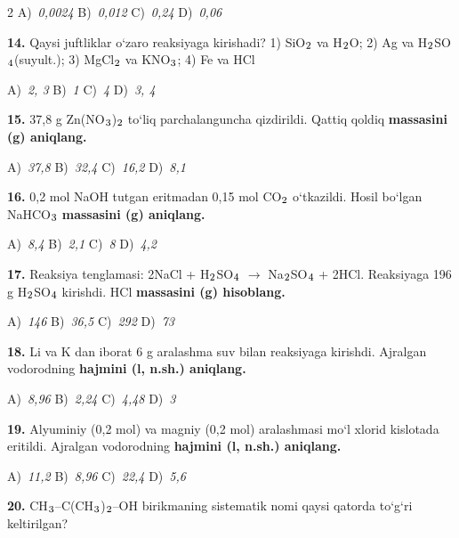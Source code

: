 \documentclass[11pt,a4paper]{article}
\renewcommand{\textsubscript}[1]{\ensuremath{_{\text{\fontsize{8}{8}\selectfont #1}}}}
\begin{document}
\begin{multicols}{2}
\noindent A)~\textsl{0,0024} \hfill B)~\textsl{0,012} \hfill C)~\textsl{0,24} \hfill D)~\textsl{0,06}\par
\vspace{4pt}
\noindent\textbf{14.} Qaysi juftliklar o`zaro reaksiyaga kirishadi? 1) SiO\textsubscript{2} va H\textsubscript{2}O; 2) Ag va H\textsubscript{2}SO\textsubscript{4}(suyult.); 3) MgCl\textsubscript{2} va KNO\textsubscript{3}; 4) Fe va HCl

\noindent A)~\textsl{2, 3} \hfill B)~\textsl{1} \hfill C)~\textsl{4} \hfill D)~\textsl{3, 4}\par
\vspace{4pt}
\noindent\textbf{15.} 37,8 g Zn(NO\textsubscript{3})\textsubscript{2} to`liq parchalanguncha qizdirildi. Qattiq qoldiq \textbf{massasini (g) aniqlang.}

\noindent A)~\textsl{37,8} \hfill B)~\textsl{32,4} \hfill C)~\textsl{16,2} \hfill D)~\textsl{8,1}\par
\vspace{4pt}
\noindent\textbf{16.} 0,2 mol NaOH tutgan eritmadan 0,15 mol CO\textsubscript{2} o`tkazildi. Hosil bo`lgan NaHCO\textsubscript{3} \textbf{massasini (g) aniqlang.}

\noindent A)~\textsl{8,4} \hfill B)~\textsl{2,1} \hfill C)~\textsl{8} \hfill D)~\textsl{4,2}\par
\vspace{4pt}
\noindent\textbf{17.} Reaksiya tenglamasi: 2NaCl + H\textsubscript{2}SO\textsubscript{4} $\to$ Na\textsubscript{2}SO\textsubscript{4} + 2HCl. Reaksiyaga 196 g H\textsubscript{2}SO\textsubscript{4} kirishdi. HCl \textbf{massasini (g) hisoblang.}

\noindent A)~\textsl{146} \hfill B)~\textsl{36,5} \hfill C)~\textsl{292} \hfill D)~\textsl{73}\par
\vspace{4pt}
\noindent\textbf{18.} Li va K dan iborat 6 g aralashma suv bilan reaksiyaga kirishdi. Ajralgan vodorodning \textbf{hajmini (l, n.sh.) aniqlang.}

\noindent A)~\textsl{8,96} \hfill B)~\textsl{2,24} \hfill C)~\textsl{4,48} \hfill D)~\textsl{3}\par
\vspace{4pt}
\noindent\textbf{19.} Alyuminiy (0,2 mol) va magniy (0,2 mol) aralashmasi mo`l xlorid kislotada eritildi. Ajralgan vodorodning \textbf{hajmini (l, n.sh.) aniqlang.}

\noindent A)~\textsl{11,2} \hfill B)~\textsl{8,96} \hfill C)~\textsl{22,4} \hfill D)~\textsl{5,6}\par
\vspace{4pt}
\noindent\textbf{20.} CH\textsubscript{3}--C(CH\textsubscript{3})\textsubscript{2}--OH birikmaning sistematik nomi qaysi qatorda to`g`ri keltirilgan?


\end{multicols}
\end{document}
